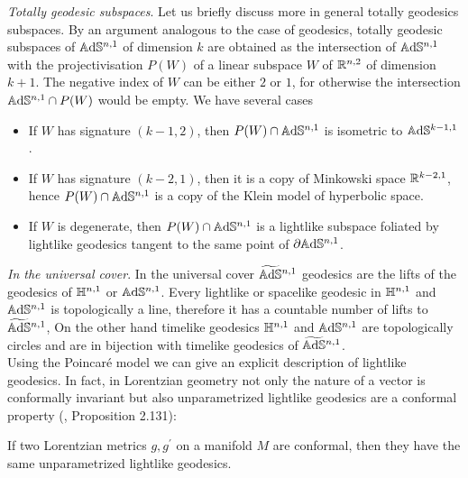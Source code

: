 \textit{Totally geodesic subspaces}. Let us briefly discuss more in general totally geodesics subspaces. By an argument analogous to the case of geodesics, totally geodesic subspaces of $\mathbb{A}\mathrm{d}\mathbb{S}^{n,1}$ of dimension $k$ are obtained as the intersection of $\mathbb{A}\mathrm{d}\mathbb{S}^{n,1}$ with the projectivisation $P(W)$ of a linear subspace $W$ of $\mathbb{R}^{n,2}$ of dimension $k+1$. The negative index of $W$ can be either $2$ or $1$, for otherwise the intersection $\mathbb{A}\mathrm{d}\mathbb{S}^{n,1}\cap P(W)$ would be empty.
We have several cases
\begin{itemize}
    \item If $W$ has signature $(k-1,2)$, then $P(W)\cap\mathbb{A}\mathrm{d}\mathbb{S}^{n,1}$  is isometric to $\mathbb{A}\mathrm{d}\mathbb{S}^{k-1,1}$.
    \item If $W$ has signature $(k-2,1)$, then it is a copy of Minkowski space $\mathbb{R}^{k-2,1}$, hence $P(W)\cap\mathbb{A}\mathrm{d}\mathbb{S}^{n,1}$ is a copy of the Klein model of hyperbolic space.
    \item If $W$ is degenerate, then $P(W)\cap\mathbb{A}\mathrm{d}\mathbb{S}^{n,1}$ is a lightlike subspace foliated by lightlike geodesics tangent to the same point of $\partial\mathbb{A}\mathrm{d}\mathbb{S}^{n,1}$. 
\end{itemize}

\textit{In the universal cover}. In the universal cover $\widetilde{\mathbb{A}\mathrm{d}\mathbb{S}}{}^{n,1}$ geodesics are the lifts of the geodesics of $\mathbb{H}^{n,1}$ or $\mathbb{A}\mathrm{d}\mathbb{S}^{n,1}$. Every lightlike or spacelike geodesic in $\mathbb{H}^{n,1}$ and $\mathbb{A}\mathrm{d}\mathbb{S}^{n,1}$ is topologically a line, therefore it has a countable number of lifts to $\widetilde{\mathbb{A}\mathrm{d}\mathbb{S}}{}^{n,1}$, On the other hand timelike geodesics $\mathbb{H}^{n,1}$ and $\mathbb{A}\mathrm{d}\mathbb{S}^{n,1}$ are topologically circles and are in bijection with timelike geodesics of $\widetilde{\mathbb{A}\mathrm{d}\mathbb{S}}{}^{n,1}$.\\
Using the Poincaré model we can give an explicit description of lightlike geodesics. In fact, in Lorentzian geometry not only the nature of a vector is conformally invariant but also unparametrized lightlike geodesics are a conformal property (\cite{Gallot}, Proposition 2.131): 
 \begin{theorem}\label{ConformalMetric} If two Lorentzian metrics $g,g^{\prime} $ on a manifold $M$ are conformal, then they have the same unparametrized lightlike geodesics.
 \end{theorem}


